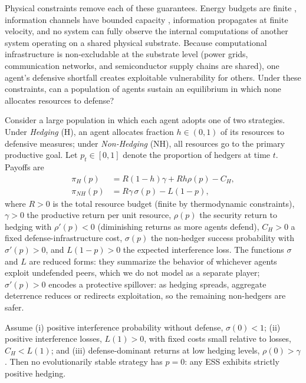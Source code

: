 \documentclass[manuscript,screen,review]{jair}
\begin{document}
Physical constraints remove each of these guarantees. Energy budgets are finite \cite{landauer.1961}, information channels have bounded capacity \cite{shannon.1948}, information propagates at finite velocity, and no system can fully observe the internal computations of another system operating on a shared physical substrate. Because computational infrastructure is non-excludable at the substrate level (power grids, communication networks, and semiconductor supply chains are shared), one agent's defensive shortfall creates exploitable vulnerability for others. Under these constraints, can a population of agents sustain an equilibrium in which none allocates resources to defense?

Consider a large population in which each agent adopts one of two strategies. Under \emph{Hedging} (H), an agent allocates fraction $h \in (0,1)$ of its resources to defensive measures; under \emph{Non-Hedging} (NH), all resources go to the primary productive goal. Let $p_t \in [0,1]$ denote the proportion of hedgers at time $t$. Payoffs are
\begin{align}
\pi_H(p) &= R(1-h)\gamma + Rh\rho(p) - C_H, \label{eq:payoff_hedge}\\
\pi_{NH}(p) &= R\gamma\,\sigma(p) - L(1-p), \label{eq:payoff_nonhedge}
\end{align}
where $R>0$ is the total resource budget (finite by thermodynamic constraints), $\gamma>0$ the productive return per unit resource, $\rho(p)$ the security return to hedging with $\rho'(p)<0$ (diminishing returns as more agents defend), $C_H>0$ a fixed defense-infrastructure cost, $\sigma(p)$ the non-hedger success probability with $\sigma'(p)>0$, and $L(1-p)>0$ the expected interference loss. The functions $\sigma$ and $L$ are reduced forms: they summarize the behavior of whichever agents exploit undefended peers, which we do not model as a separate player; $\sigma'(p)>0$ encodes a protective spillover: as hedging spreads, aggregate deterrence reduces or redirects exploitation, so the remaining non-hedgers are safer.

\begin{lemma}
\label{lem:hedging}
Assume (i) positive interference probability without defense, $\sigma(0)<1$; (ii) positive interference losses, $L(1)>0$, with fixed costs small relative to losses, $C_H < L(1)$; and (iii) defense-dominant returns at low hedging levels, $\rho(0)>\gamma$. Then no evolutionarily stable strategy \cite{hofbauer.sigmund.1998,weibull.1995} has $p=0$: any ESS exhibits strictly positive hedging.
\end{lemma}
\end{document}
